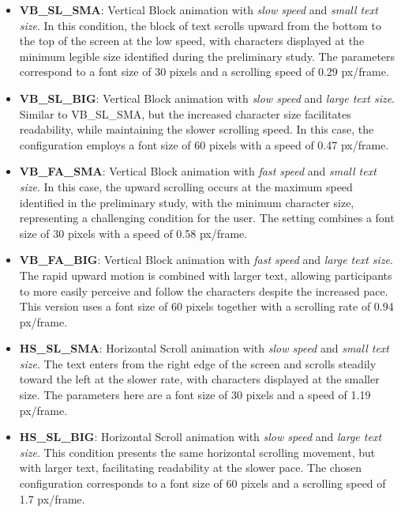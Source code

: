 \documentclass[12pt]{report}
\begin{document}
\begin{itemize}
    \item \textbf{VB\_SL\_SMA}: Vertical Block animation with \emph{slow speed} and \emph{small text size}. 
    In this condition, the block of text scrolls upward from the bottom to the top of the screen at the low speed, with characters displayed at the minimum legible size identified during the preliminary study.
    The parameters correspond to a font size of 30 pixels and a scrolling speed of 0.29 px/frame.

    \item \textbf{VB\_SL\_BIG}: Vertical Block animation with \emph{slow speed} and \emph{large text size}. 
    Similar to VB\_SL\_SMA, but the increased character size facilitates readability, while maintaining the slower scrolling speed. 
    In this case, the configuration employs a font size of 60 pixels with a speed of 0.47 px/frame. 

    \item \textbf{VB\_FA\_SMA}: Vertical Block animation with \emph{fast speed} and \emph{small text size}. 
    In this case, the upward scrolling occurs at the maximum speed identified in the preliminary study, with the minimum character size, representing a challenging condition for the user.  
    The setting combines a font size of 30 pixels with a speed of 0.58 px/frame.

    \item \textbf{VB\_FA\_BIG}: Vertical Block animation with \emph{fast speed} and \emph{large text size}. 
    The rapid upward motion is combined with larger text, allowing participants to more easily perceive and follow the characters despite the increased pace.  
    This version uses a font size of 60 pixels together with a scrolling rate of 0.94 px/frame. 

    \item \textbf{HS\_SL\_SMA}: Horizontal Scroll animation with \emph{slow speed} and \emph{small text size}. 
    The text enters from the right edge of the screen and scrolls steadily toward the left at the slower rate, with characters displayed at the smaller size.  
    The parameters here are a font size of 30 pixels and a speed of 1.19 px/frame. 

    \item \textbf{HS\_SL\_BIG}: Horizontal Scroll animation with \emph{slow speed} and \emph{large text size}. 
    This condition presents the same horizontal scrolling movement, but with larger text, facilitating readability at the slower pace. 
    The chosen configuration corresponds to a font size of 60 pixels and a scrolling speed of 1.7 px/frame. 


\end{itemize}
\end{document}
